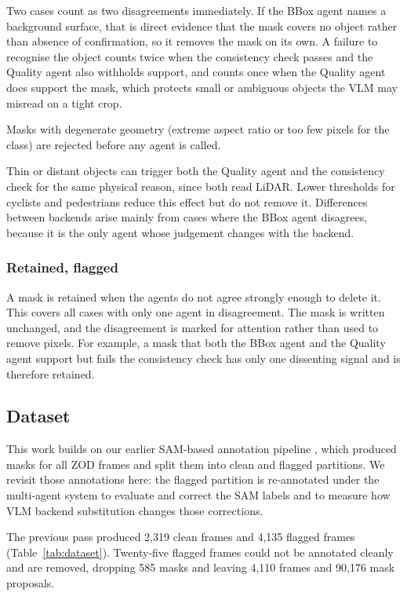 \documentclass[a4paper,twoside]{article}
\begin{document}
Two cases count as two disagreements immediately.
If the BBox agent names a background surface, that is direct evidence that the mask covers no object rather than absence of confirmation, so it removes the mask on its own.
A failure to recognise the object counts twice when the consistency check passes and the Quality agent also withholds support, and counts once when the Quality agent does support the mask, which protects small or ambiguous objects the VLM may misread on a tight crop.

Masks with degenerate geometry (extreme aspect ratio or too few pixels for the class) are rejected before any agent is called.

Thin or distant objects can trigger both the Quality agent and the consistency check for the same physical reason, since both read LiDAR.  
Lower thresholds for cyclists and pedestrians reduce this effect but do not remove it.  
Differences between backends arise mainly from cases where the BBox agent disagrees, because it is the only agent whose judgement changes with the backend.

\subsubsection{Retained, flagged}
A mask is retained when the agents do not agree strongly enough to delete it.  
This covers all cases with only one agent in disagreement.  
The mask is written unchanged, and the disagreement is marked for attention rather than used to remove pixels.  
For example, a mask that both the BBox agent and the Quality agent support but fails the consistency check has only one dissenting signal and is therefore retained.

\subsection{Dataset}
\label{sec:dataset}

This work builds on our earlier SAM-based annotation pipeline \cite{tahves2026samenhancedsegmentationroaddatasets}, which produced masks for all ZOD \cite{alibeigi2023zod} frames and split them into clean and flagged partitions.  
We revisit those annotations here: the flagged partition is re‑annotated under the multi‑agent system to evaluate and correct the SAM labels and to measure how VLM backend substitution changes those corrections.

The previous pass produced 2,319 clean frames and 4,135 flagged frames (Table~\ref{tab:dataset}).  
Twenty‑five flagged frames could not be annotated cleanly and are removed, dropping 585 masks and leaving 4,110 frames and 90,176 mask proposals.
\end{document}
